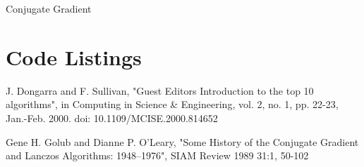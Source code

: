 \begin{algorithm}[H]



\caption{Conjugate Gradient}
\label{alg:cg}
\end{algorithm}


\section{Code Listings}


\begin{bibliograhy}

    J. Dongarra and F. Sullivan, 
    "Guest Editors Introduction to the top 10 algorithms",
    in Computing in Science & Engineering, vol. 2, no. 1, pp. 22-23, Jan.-Feb. 2000.
    doi: 10.1109/MCISE.2000.814652

    Gene H. Golub and Dianne P. O’Leary,
    "Some History of the Conjugate Gradient and Lanczos Algorithms: 1948–1976",
    SIAM Review 1989 31:1, 50-102 
    
\end{bibliograhy}